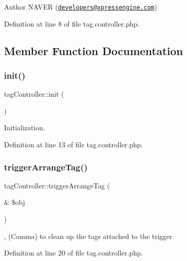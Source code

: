 \begin{DoxyAuthor}{Author}
N\+A\+V\+ER (\href{mailto:developers@xpressengine.com}{\tt developers@xpressengine.\+com}) 
\end{DoxyAuthor}


Definition at line 8 of file tag.\+controller.\+php.



\subsection{Member Function Documentation}
\hypertarget{classtagController_ada37b0f9e302b94d20dcc5f7168afb3b}{}\label{classtagController_ada37b0f9e302b94d20dcc5f7168afb3b} 
\subsubsection{\texorpdfstring{init()}{init()}}
{\footnotesize\ttfamily tag\+Controller\+::init (\begin{DoxyParamCaption}{ }\end{DoxyParamCaption})}



Initialization. 



Definition at line 13 of file tag.\+controller.\+php.

\hypertarget{classtagController_a22edcccfa0ab6967230adf5a3d1bab27}{}\label{classtagController_a22edcccfa0ab6967230adf5a3d1bab27} 
\subsubsection{\texorpdfstring{trigger\+Arrange\+Tag()}{triggerArrangeTag()}}
{\footnotesize\ttfamily tag\+Controller\+::trigger\+Arrange\+Tag (\begin{DoxyParamCaption}\item[{\&}]{\$obj }\end{DoxyParamCaption})}



, (Comma) to clean up the tags attached to the trigger 



Definition at line 20 of file tag.\+controller.\+php.

